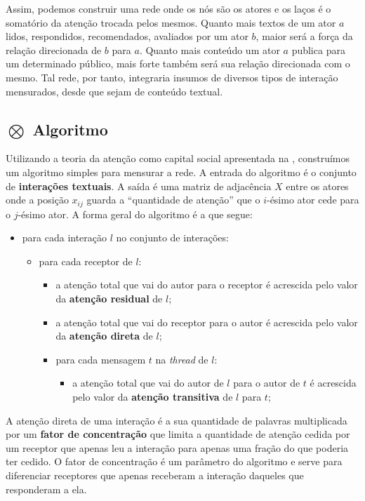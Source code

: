 Assim, podemos construir uma rede onde os nós são os atores e os laços é o
somatório da atenção trocada pelos mesmos. Quanto mais textos de um ator $a$
lidos, respondidos, recomendados, avaliados por um ator $b$, maior será a força
da relação direcionada de $b$ para $a$. Quanto mais conteúdo um ator $a$ publica
para um determinado público, mais forte também será sua relação direcionada
com o mesmo. Tal rede, por tanto, integraria insumos de diversos tipos de
interação mensurados, desde que sejam de conteúdo textual.

\subsection{$\bigotimes$ Algoritmo}
\label{sec:formalizacao}

Utilizando a teoria da atenção como capital social apresentada na
, construímos um algoritmo simples para mensurar a
rede. A entrada do algoritmo é o conjunto de \textbf{interações textuais}. A
saída é uma matriz de adjacência $X$ entre os atores onde a posição $x_{ij}$
guarda a ``quantidade de atenção'' que o $i$-ésimo ator cede para o $j$-ésimo
ator. A forma geral do algoritmo é a que segue:

\begin{itemize}
  \item para cada interação $l$ no conjunto de interações: \begin{itemize}
    \item para cada receptor de $l$: \begin{itemize}
      \item a atenção total que vai do autor para o receptor é acrescida pelo
      valor da \textbf{atenção residual} de $l$;
      \item a atenção total que vai do receptor para o autor é acrescida pelo valor da
		\textbf{atenção direta} de $l$;
	  \item	para cada mensagem $t$ na \emph{thread} de $l$: \begin{itemize}
	    \item a atenção total que vai do autor de $l$ para o autor de $t$ é
			acrescida pelo valor da \textbf{atenção transitiva} de $l$ para $t$;
		\end{itemize}
	\end{itemize}
\end{itemize}	
\end{itemize}
		 
A atenção direta de uma interação é a sua quantidade de palavras multiplicada
por um \textbf{fator de concentração} que limita a quantidade de atenção cedida
por um receptor que apenas leu a interação para apenas uma fração do que poderia
ter cedido. O fator de concentração é um parâmetro do algoritmo e
serve para diferenciar receptores que apenas receberam a interação
daqueles que responderam a ela. 

